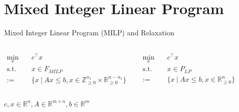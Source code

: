 \section{Mixed Integer Linear Program}

\begin{frame}{Mixed Integer Linear Program (MILP) and Relaxation}
\small
\begin{columns}

	\begin{tcolorbox}[colback=white, title={MILP (standard form)}]
    \begin{align*}
    	\min_{x}\quad &c^\top x \\
    	\text{s.t.}\quad & x\in F_{MILP} \\
    	:= &\{x \:\vert\: Ax \leq b, x \in \mathbb{Z}_{\geq 0}^{n_1} \times \mathbb{R}_{\geq 0}^{n-n_1} \}
    \end{align*}
    \end{tcolorbox}

	\begin{tcolorbox}[colback=white, title={LP Relaxation}]
    \begin{align*}
    	\min_{x}\quad &c^\top x \\
    	\text{s.t.}\quad &x \in P_{LP}\\
    	:= &\{x \:\vert\: Ax \leq b, x \in \mathbb{R}_{\geq 0}^{n}\}
    \end{align*}
    \end{tcolorbox}
\end{columns}
$c,x \in \mathbb{R}^n, A \in \mathbb{R}^{m \times n}, b \in \mathbb{R}^m$
\end{frame}

